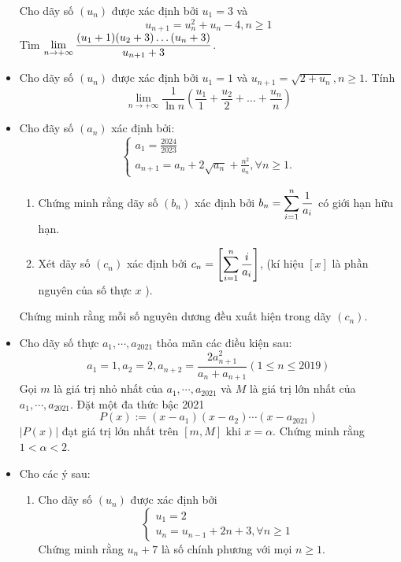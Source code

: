 \documentclass[11pt]{scrartcl}
\begin{document}
\begin{itemize}[label=, leftmargin=0em, itemsep=-0em]
\begin{btvn}
        Cho dãy số $(u_n)$ được xác định bởi $u_1 = 3$ và $$u_{n + 1} = u_n^2 + u_n - 4, n \geq 1$$ Tìm $\dlim\frac{(u_1 + 1)(u_2 + 3)\dots(u_n + 3)}{u_{n + 1} +3}$.
    \end{btvn}
    \item \begin{btvn}
        Cho dãy số $(u_n)$ được xác định bởi $u_1 = 1$ và $u_{n + 1} = \sqrt{2 + u_n}, n \geq 1$. Tính
        \[
            \lim_{n \to + \infty} \frac{1}{\ln n}\left(\frac{u_1}{1} + \frac{u_2}{2} + \dots + \frac{u_n}{n}\right)
        \]
    \end{btvn}
    \item \begin{btvn}
        Cho đãy số $\left(a_n\right)$ xác định bởi: \[\left\{\begin{array}{l}a_1=\frac{2024}{2023} \\ a_{n+1}=a_n+2 \sqrt{a_n}+\frac{n^2}{a_n}, \forall n \geq 1 .\end{array}\right.\]
        \begin{enumerate}[label=(\alph*)]
            \item Chứng minh rằng dãy số $\left(b_n\right)$ xác định bởi $b_n=\dsum_{i=1}^n \frac{1}{a_i}$ có giới hạn hữu hạn.
            \item Xét dãy số $\left(c_n\right)$ xác định bởi $c_n=\left[\dsum_{i=1}^n \frac{i}{a_i}\right]$, (kí hiệu $[x]$ là phần nguyên của số thực $x$ ).
        \end{enumerate}
        Chứng minh rằng mỗi số nguyên dương đều xuất hiện trong dãy $\left(c_n\right)$.
    \end{btvn}
    \item \begin{btvn}   
        Cho dãy số thực $a_1, \cdots ,a_{2021}$ thỏa mãn các điều kiện sau:
        $$a_1=1, a_2=2, a_{n+2}=\frac{2a_{n+1}^2}{a_n+a_{n+1}} (1\leq n \leq 2019)$$
        Gọi $m$ là giá trị nhỏ nhất của $a_1, \cdots ,a_{2021}$ và $M$ là giá trị lớn nhất của $a_1, \cdots ,a_{2021}$.
        Đặt một đa thức bậc 2021
        $$P(x):=(x-a_1)(x-a_2) \cdots (x-a_{2021})$$$|P(x)|$ đạt giá trị lớn nhất trên $[m, M]$ khi $x=\alpha$. Chứng minh rằng $1<\alpha <2$.
    \end{btvn}
    \item \begin{btvn} Cho các ý sau:
        \begin{enumerate}
            \item Cho dãy số $(u_n)$ được xác định bởi
            \[\left\{
                \begin{array}{l}
                    u_1 = 2 \\
                    u_n = u_{n - 1} + 2n + 3, \forall n \geq 1 
                \end{array}\right.\]
            Chứng minh rằng $u_n + 7$ là số chính phương với mọi $n \geq 1$.
            

\end{enumerate}
\end{btvn}
\end{itemize}
\end{document}
